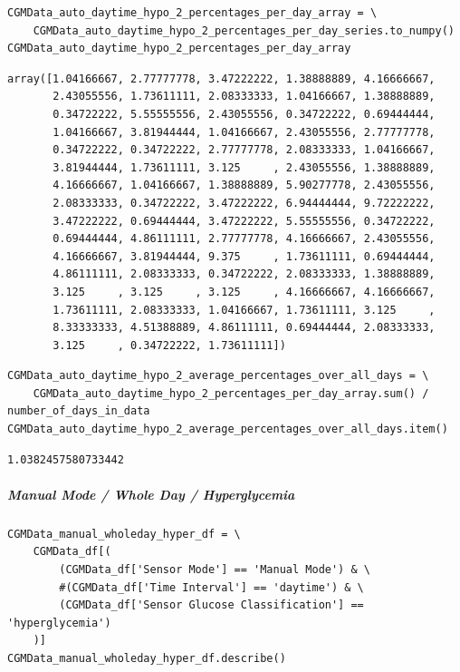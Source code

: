 \begin{verbatim}
CGMData_auto_daytime_hypo_2_percentages_per_day_array = \
    CGMData_auto_daytime_hypo_2_percentages_per_day_series.to_numpy()
CGMData_auto_daytime_hypo_2_percentages_per_day_array
\end{verbatim}

\begin{verbatim}
array([1.04166667, 2.77777778, 3.47222222, 1.38888889, 4.16666667,
       2.43055556, 1.73611111, 2.08333333, 1.04166667, 1.38888889,
       0.34722222, 5.55555556, 2.43055556, 0.34722222, 0.69444444,
       1.04166667, 3.81944444, 1.04166667, 2.43055556, 2.77777778,
       0.34722222, 0.34722222, 2.77777778, 2.08333333, 1.04166667,
       3.81944444, 1.73611111, 3.125     , 2.43055556, 1.38888889,
       4.16666667, 1.04166667, 1.38888889, 5.90277778, 2.43055556,
       2.08333333, 0.34722222, 3.47222222, 6.94444444, 9.72222222,
       3.47222222, 0.69444444, 3.47222222, 5.55555556, 0.34722222,
       0.69444444, 4.86111111, 2.77777778, 4.16666667, 2.43055556,
       4.16666667, 3.81944444, 9.375     , 1.73611111, 0.69444444,
       4.86111111, 2.08333333, 0.34722222, 2.08333333, 1.38888889,
       3.125     , 3.125     , 3.125     , 4.16666667, 4.16666667,
       1.73611111, 2.08333333, 1.04166667, 1.73611111, 3.125     ,
       8.33333333, 4.51388889, 4.86111111, 0.69444444, 2.08333333,
       3.125     , 0.34722222, 1.73611111])
\end{verbatim}

\begin{verbatim}
CGMData_auto_daytime_hypo_2_average_percentages_over_all_days = \
    CGMData_auto_daytime_hypo_2_percentages_per_day_array.sum() / number_of_days_in_data
CGMData_auto_daytime_hypo_2_average_percentages_over_all_days.item()
\end{verbatim}

\begin{verbatim}
1.0382457580733442
\end{verbatim}

\subparagraph{Manual Mode / Whole Day / Hyperglycemia}

\begin{verbatim}
CGMData_manual_wholeday_hyper_df = \
    CGMData_df[(
        (CGMData_df['Sensor Mode'] == 'Manual Mode') & \
        #(CGMData_df['Time Interval'] == 'daytime') & \
        (CGMData_df['Sensor Glucose Classification'] == 'hyperglycemia')
    )]
CGMData_manual_wholeday_hyper_df.describe()
\end{verbatim}

